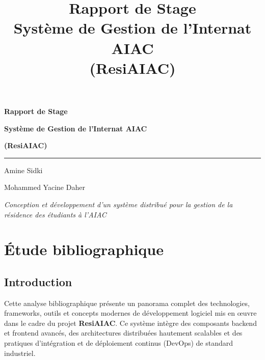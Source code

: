 \documentclass[a4paper,12pt]{article}
\title{\textbf{Rapport de Stage \\ Système de Gestion de l'Internat AIAC \\ (ResiAIAC)}}
\author{}
\date{}
\begin{document}
\begin{titlepage}
    \centering

    \vspace*{1cm}

    \vfill

    {\LARGE \textbf{Rapport de Stage}\par}
    \vspace{0.5cm}
    {\LARGE \textbf{Système de Gestion de l'Internat AIAC}\par}
    \vspace{0.3cm}
    {\LARGE \textbf{(ResiAIAC)}\par}

    \vspace{0.8cm}

    \rule{0.5\textwidth}{0.1pt}

    \vspace{0.8cm}

    {\large Amine Sidki\par}
    \vspace{0.3cm}
    {\large Mohammed Yacine Daher\par}

    \vfill

    {\large \textit{Conception et développement d'un système distribué pour la gestion de la résidence des étudiants à l'AIAC}\par}

    \vspace{1cm}

    \vspace*{1cm}

\end{titlepage}

\tableofcontents
\newpage

\section{Étude bibliographique}

\subsection{Introduction}
Cette analyse bibliographique présente un panorama complet des technologies, frameworks, outils et concepts modernes de développement logiciel mis en œuvre dans le cadre du projet \textbf{ResiAIAC}. Ce système intègre des composants backend et frontend avancés, des architectures distribuées hautement scalables et des pratiques d'intégration et de déploiement continus (DevOps) de standard industriel.
\end{document}
